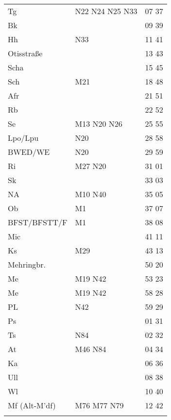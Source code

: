 \begin{tabular}{!{\color{schiefergrau}\vrule width 3pt}*{3}{l!{\color{schiefergrau}\vrule width 3pt}}}
\hline
{}
 \\
\hline
Tg           & \nbus{} N22 N24 N25 N33             & 07 37 \\
Bk           &                                     & 09 39 \\
Hh           & \nbus{} N33                         & 11 41 \\
Otisstraße   &                                     & 13 43 \\
Scha         &                                     & 15 45 \\
Sch          & \mbus{} M21                         & 18 48 \\
Afr          &                                     & 21 51 \\
Rb           &                                     & 22 52 \\
Se           & \mtram{} M13 \nbus{} N20 N26        & 25 55 \\
Lpo/Lpu      & \nuneun{} \nbus{} N20               & 28 58 \\
BWED/WE      & \nbus{} N20                         & 29 59 \\
Ri           & \mbus{} M27 \nbus{} N20             & 31 01 \\
Sk           &                                     & 33 03 \\
NA           & \mtram{} M10 \nbus{} N40            & 35 05 \\
Ob           & \mtram{} M1                         & 37 07 \\
BFST/BFSTT/F & \mtram{} M1                         & 38 08 \\
Mic          & \nuzwei{}                           & 41 11 \\
Ks           & \mbus{} M29                         & 43 13 \\
Mehringbr.   & \nueins{}                           & 50 20 \\
Me           & \nusieben{} \mbus{} M19 \nbus{} N42 & 53 23 \\
\hline
Me           & \nusieben{} \mbus{} M19 \nbus{} N42 & 58 28 \\
PL           & \nbus{} N42                         & 59 29 \\
Ps           &                                     & 01 31 \\
Ts           & \nbus{} N84                         & 02 32 \\
At           & \mbus{} M46 \nbus{} N84             & 04 34 \\
Ka           &                                     & 06 36 \\
Ull          &                                     & 08 38 \\
Wl           &                                     & 10 40 \\
Mf (Alt-M'df)& \mbus{} M76 M77 \nbus{} N79         & 12 42 \\
\myhline
\end{tabular}
